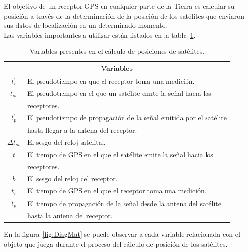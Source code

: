 El objetivo de un receptor GPS en cualquier parte de la Tierra es calcular su posición a través de la determinación de la posición de los satélites que enviaron sus datos de localización en un determinado momento.\\

Las variables importantes a utilizar están listados en la tabla~\ref{Tab:TablaVariables}.

\begin{table}[!htb]
\begin{center}
\caption{Variables presentes en el cálculo de posiciones de satélites.}
\label{Tab:TablaVariables}
\begin{tabular}{|c|l|}
	\hline
	\multicolumn{2}{|c|}{\textbf{Variables}}\\
	\hline
	$t^{'}_r$ & El pseudotiempo en que el receptor toma una medición.\\
	\hline
	$t_{sv}$ & El pseudotiempo en el que un satélite emite la señal hacia los \\ & receptores.\\
	\hline
	$t^{'}_p$ & El pseudotiempo de propagación de la señal emitida por el satélite\\ & hasta llegar a la antena del receptor.\\
	\hline
	$\Delta t_{sv}$ & El sesgo del reloj satelital.\\
	\hline
	$t$ & El tiempo de GPS en el que el satélite emite la señal hacia los\\ & receptores.\\
	\hline 
	$b$ & El sesgo del reloj del receptor.\\
	\hline
	$t_r$ & El tiempo de GPS en el que el receptor toma una medición.\\
	\hline
	$t_p$ & El tiempo de propagación de la señal desde la antena del satélite\\ & hasta la antena del receptor.\\
	\hline
\end{tabular}
\end{center}
\end{table}

En la figura~\ref{fig:DiagMat} se puede observar a cada variable relacionada con el objeto que juega durante el proceso del cálculo de posición de los satélites. 

